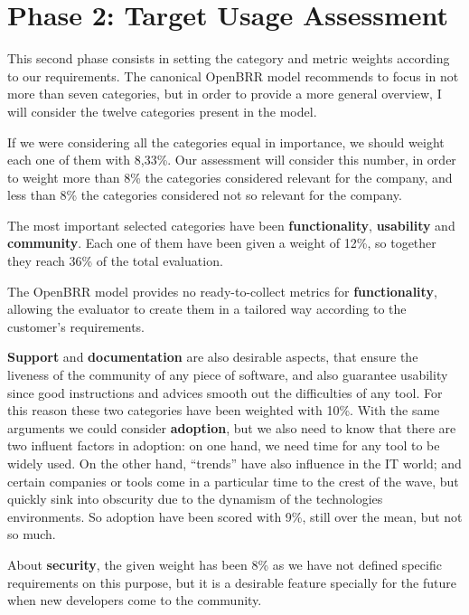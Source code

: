 \documentclass[a4paper,12pt]{book}
\begin{document}

\section{Phase 2: Target Usage Assessment}
\label{sec:phase2}
This second phase consists in setting the category and metric weights according to our requirements. The canonical OpenBRR model recommends to focus in not more than seven categories, but in order to provide a more general overview, I will consider the twelve categories present in the model.

If we were considering all the categories equal in importance, we should weight
each one of them with 8,33\%. Our assessment will consider this number, in
order to weight more than 8\% the categories considered relevant for the
company, and less than 8\% the categories considered not so relevant for the
company.

The most important selected categories have been \textbf{functionality},
\textbf{usability} and \textbf{community}. Each one of them have been given a
weight of 12\%, so together they reach 36\% of the total evaluation.

The OpenBRR model provides no ready-to-collect metrics for
\textbf{functionality}, allowing the evaluator to create them in a tailored way
according to the customer's requirements. 


\textbf{Support} and \textbf{documentation} are also desirable aspects, that
ensure the liveness of the community of any piece of software, and also
guarantee usability since good instructions and advices smooth out the
difficulties of any tool. For this reason these two categories have been
weighted with 10\%. With the same arguments we could consider
\textbf{adoption}, but we also need to know that there are two influent factors
in adoption: on one hand, we need time for any tool to be widely used. On the
other hand, ``trends'' have also influence in the IT world; and certain
companies or tools come in a particular time to the crest of the wave, but
quickly sink into obscurity due to the dynamism of the technologies
environments. So adoption have been scored with 9\%, still over the mean, but
not so much.

About \textbf{security}, the given weight has been 8\% as we have not defined specific requirements on this purpose, but it is a desirable feature specially for the future when new developers come to the community.
\end{document}

